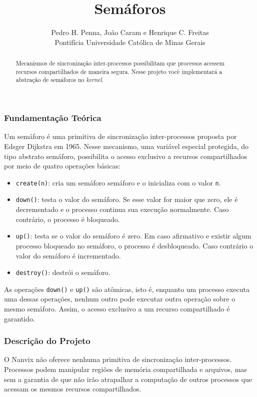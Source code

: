 \documentclass[11pt]{article}
\title{Semáforos}
\author{Pedro H. Penna, João Caram e Henrique C. Freitas\\[0.3em]
\small Pontifícia Universidade Católica de Minas Gerais}
\date{}
\begin{document}
\maketitle

\begin{abstract}

\noindent Mecanismos de sincronização inter-processos possibilitam que processos acessem recursos compartilhados de maneira segura. Nesse projeto você implementará a abstração de semáforos no \textit{kernel}.

\end{abstract}

\subsubsection*{Fundamentação Teórica}

Um semáforo é uma primitiva de sincronização inter-processos proposta por Edsger Dijkstra em 1965. Nesse mecanismo, uma variável especial protegida, do tipo abstrato semáforo, possibilita o acesso exclusivo a recursos compartilhados por meio de quatro operações básicas:

\begin{itemize}
	\item \texttt{create(n)}: cria um semáforo semáforo e o inicializa com o valor \texttt{n}.
	\item \texttt{down()}: testa o valor do semáforo. Se esse valor for maior que zero, ele é decrementado e o processo continua sua execução normalmente. Caso contrário, o processo é bloqueado.
	\item \texttt{up()}: testa se o valor do semáforo é zero. Em caso afirmativo e existir algum processo bloqueado no semáforo, o processo é desbloqueado. Caso contrário o valor do semáforo é incrementado.
	\item \texttt{destroy()}: destrói o semáforo.
\end{itemize}

As operações \texttt{down()} e \texttt{up()} são atômicas, isto é, enquanto um processo executa uma dessas operações, nenhum outro pode executar outra operação sobre o mesmo semáforo. Assim, o acesso exclusivo a um recurso compartilhado é garantido.

\subsubsection*{Descrição do Projeto}

O Nanvix não oferece nenhuma primitiva de sincronização inter-processos. Processos podem manipular regiões de memória compartilhada e arquivos, mas sem a garantia de que não irão atrapalhar a computação de outros processos que acessam os mesmos recursos compartilhados.
\end{document}
